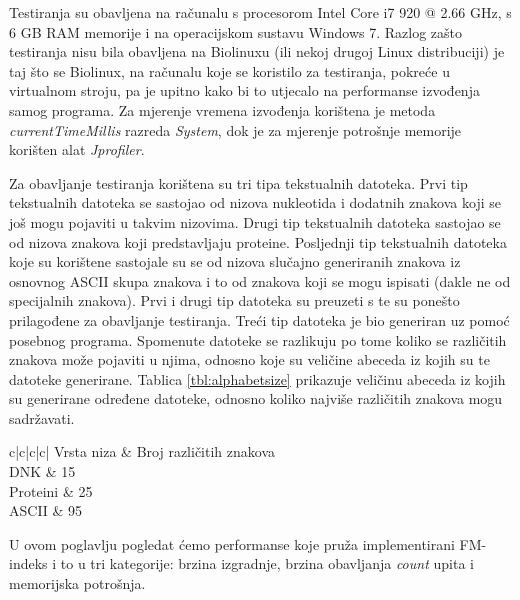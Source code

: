 Testiranja su obavljena na računalu s procesorom Intel Core i7 920 @ 2.66 GHz, s 6 GB RAM memorije i na operacijskom sustavu Windows 7. Razlog zašto testiranja nisu bila obavljena na Biolinuxu (ili nekoj drugoj Linux distribuciji) je taj što se Biolinux, na računalu koje se koristilo za testiranja, pokreće u virtualnom stroju, pa je upitno kako bi to utjecalo na performanse izvođenja samog programa. Za mjerenje vremena izvođenja korištena je metoda \textit{currentTimeMillis} razreda \textit{System}, dok je za mjerenje potrošnje memorije korišten alat \textit{Jprofiler}.

Za obavljanje testiranja korištena su tri tipa tekstualnih datoteka. Prvi tip tekstualnih datoteka se sastojao od nizova nukleotida i dodatnih znakova koji se još mogu pojaviti u takvim nizovima. Drugi tip tekstualnih datoteka sastojao se od nizova znakova koji predstavljaju proteine. Posljednji tip tekstualnih datoteka koje su korištene sastojale su se od nizova slučajno generiranih znakova iz osnovnog ASCII skupa znakova i to od znakova koji se mogu ispisati (dakle ne od specijalnih znakova). Prvi i drugi tip datoteka su preuzeti s \cite{corpus} te su ponešto prilagođene za obavljanje testiranja. Treći tip datoteka je bio generiran uz pomoć posebnog programa. Spomenute datoteke se razlikuju po tome koliko se različitih znakova može pojaviti u njima, odnosno koje su veličine abeceda iz kojih su te datoteke generirane. Tablica \ref{tbl:alphabetsize} prikazuje veličinu abeceda iz kojih su generirane određene datoteke, odnosno koliko najviše različitih znakova mogu sadržavati. 

\begin{table}[h]
\caption{Maksimalna veličina abecede pojedinih datoteka}
\label{tbl:alphabetsize}
\centering\begin{tabular}{c|c|c|c|}
 \hline
{} {Vrsta niza} & Broj različitih znakova   \\ \hline
{} {   DNK   }		&	15		\\ \hline
{} {   Proteini   }	&	25		\\ \hline
{} {   ASCII   }	&	95		\\ \hline
\end{tabular}
\end{table}


U ovom poglavlju pogledat ćemo performanse koje pruža implementirani FM-indeks i to u tri kategorije: brzina izgradnje, brzina obavljanja \textit{count} upita i memorijska potrošnja.

